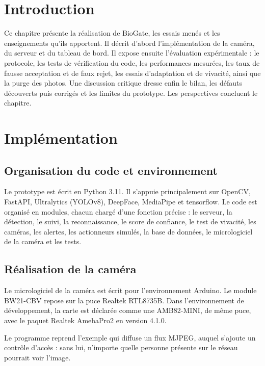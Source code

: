 \section*{Introduction}

Ce chapitre présente la réalisation de BioGate, les essais menés et les enseignements qu'ils apportent. Il décrit d'abord l'implémentation de la caméra, du serveur et du tableau de bord. Il expose ensuite l'évaluation expérimentale : le protocole, les tests de vérification du code, les performances mesurées, les taux de fausse acceptation et de faux rejet, les essais d'adaptation et de vivacité, ainsi que la purge des photos. Une discussion critique dresse enfin le bilan, les défauts découverts puis corrigés et les limites du prototype. Les perspectives concluent le chapitre.

\section{Implémentation}

\subsection{Organisation du code et environnement}

Le prototype est écrit en Python 3.11. Il s'appuie principalement sur OpenCV, FastAPI, Ultralytics (YOLOv8), DeepFace, MediaPipe et \gls{tensorflow}. Le code est organisé en modules, chacun chargé d'une fonction précise : le serveur, la détection, le suivi, la reconnaissance, le score de confiance, le test de vivacité, les caméras, les alertes, les actionneurs simulés, la base de données, le micrologiciel de la caméra et les tests.

\subsection{Réalisation de la caméra}

Le micrologiciel de la caméra est écrit pour l'environnement Arduino. Le module BW21-CBV repose sur la puce Realtek RTL8735B. Dans l'environnement de développement, la carte est déclarée comme une AMB82-MINI, de même puce, avec le paquet Realtek AmebaPro2 en version 4.1.0. \begin{maj}
Le programme reprend l'exemple qui diffuse un flux MJPEG, auquel s'ajoute un contrôle d'accès : sans lui, n'importe quelle personne présente sur le réseau pourrait voir l'image.
\end{maj}

